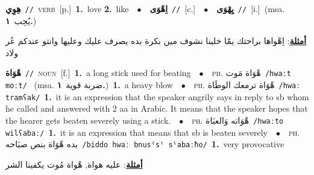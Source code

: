 \documentclass[10pt,a4paper,twoside]{article} %
\begin{document}
\begin{multicols}{2}
{\setlength\topsep{0pt}\textbf{\foreignlanguage{arabic}{هِوِي}}\ {\color{gray}\texttt{//}\color{black}}\ \textsc{verb}\ [p.]\ \textbf{1.}~love  \textbf{2.}~like\ \ $\bullet$\ \ \setlength\topsep{0pt}\textbf{\foreignlanguage{arabic}{اِهْوَى}}\ {\color{gray}\texttt{//}\color{black}}\ [c.]\ \ $\bullet$\ \ \setlength\topsep{0pt}\textbf{\foreignlanguage{arabic}{يِهْوَى}}\ {\color{gray}\texttt{//}\color{black}}\ [i.]\ \color{gray}(msa. \foreignlanguage{arabic}{يُحِب}~\foreignlanguage{arabic}{\textbf{١.}})\color{black}\  \begin{flushright}\color{gray}\foreignlanguage{arabic}{\textbf{\underline{\foreignlanguage{arabic}{أمثلة}}}: اِهْواها براحتك يمّا خلينا نشوف مين بكرة بده يصرف عليك وعليها وانتو عندكم عُر ولاد}\end{flushright}\color{black}} \vspace{2mm}

{\setlength\topsep{0pt}\textbf{\foreignlanguage{arabic}{هْوَاة}}\ {\color{gray}\texttt{//}\color{black}}\ \textsc{noun}\ [f.]\ \textbf{1.}~a long stick used for beating\ \ $\bullet$\ \ \textsc{ph.} \color{gray} \foreignlanguage{arabic}{هْوَاة مَوت}\color{black}\ {\color{gray}\texttt{/{\sffamily hwaːt moːt}/}\color{black}}\ \color{gray} (msa. \foreignlanguage{arabic}{ضربة قوية}~\foreignlanguage{arabic}{\textbf{١.}})\color{black}\ \textbf{1.}~a heavy blow\ \ $\bullet$\ \ \textsc{ph.} \color{gray} \foreignlanguage{arabic}{هْوَاة ترمعك الوطَاة}\color{black}\ {\color{gray}\texttt{/{\sffamily hwaː tramʕak}/}\color{black}}\ \textbf{1.}~it is an expression that the speaker angrily says in reply to sb whom he called and answered with 2 aa in Arabic. It means that the speaker hopes that the hearer gets beaten severely using a stick.\ \ $\bullet$\ \ \textsc{ph.} \color{gray} \foreignlanguage{arabic}{هْوَاته وَالعبَاة}\color{black}\ {\color{gray}\texttt{/{\sffamily hwaːto wilʕabaː}/}\color{black}}\ \textbf{1.}~it is an expression that means that sb is beaten severely\ \ $\bullet$\ \ \textsc{ph.} \color{gray} \foreignlanguage{arabic}{بده هْوَاة بنص صبَاحه}\color{black}\ {\color{gray}\texttt{/{\sffamily biddo hwaː bnusˤsˤ sˤabaːħo}/}\color{black}}\ \textbf{1.}~very provocative\  \begin{flushright}\color{gray}\foreignlanguage{arabic}{\textbf{\underline{\foreignlanguage{arabic}{أمثلة}}}: عليه هواة, هْواة مُوت يكفينا الشر}\end{flushright}\color{black}} \vspace{2mm}


\end{multicols}
\end{document}
